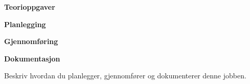 \vskip 10pt 
\textbf{Teorioppgaver}

\vskip 5pt 

\vskip 10pt 
\textbf{Planlegging}


\vskip 10pt 
\textbf{Gjennomføring}

\vskip 10pt 
\textbf{Dokumentasjon}

Beskriv hvordan du planlegger, gjennomfører og dokumenterer denne jobben. 



















\vfil \eject

















